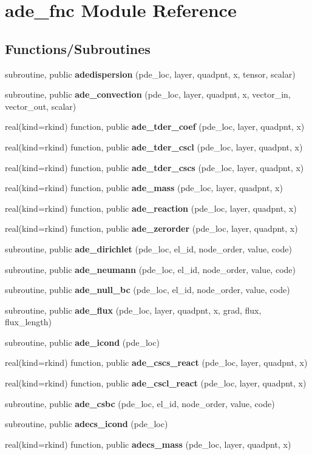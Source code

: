 \section{ade\+\_\+fnc Module Reference}
\label{namespaceade__fnc}
\subsection*{Functions/\+Subroutines}
\begin{DoxyCompactItemize}
\item 
subroutine, public {\bf adedispersion} (pde\+\_\+loc, layer, quadpnt, x, tensor, scalar)
\item 
subroutine, public {\bf ade\+\_\+convection} (pde\+\_\+loc, layer, quadpnt, x, vector\+\_\+in, vector\+\_\+out, scalar)
\item 
real(kind=rkind) function, public {\bf ade\+\_\+tder\+\_\+coef} (pde\+\_\+loc, layer, quadpnt, x)
\item 
real(kind=rkind) function, public {\bf ade\+\_\+tder\+\_\+cscl} (pde\+\_\+loc, layer, quadpnt, x)
\item 
real(kind=rkind) function, public {\bf ade\+\_\+tder\+\_\+cscs} (pde\+\_\+loc, layer, quadpnt, x)
\item 
real(kind=rkind) function, public {\bf ade\+\_\+mass} (pde\+\_\+loc, layer, quadpnt, x)
\item 
real(kind=rkind) function, public {\bf ade\+\_\+reaction} (pde\+\_\+loc, layer, quadpnt, x)
\item 
real(kind=rkind) function, public {\bf ade\+\_\+zerorder} (pde\+\_\+loc, layer, quadpnt, x)
\item 
subroutine, public {\bf ade\+\_\+dirichlet} (pde\+\_\+loc, el\+\_\+id, node\+\_\+order, value, code)
\item 
subroutine, public {\bf ade\+\_\+neumann} (pde\+\_\+loc, el\+\_\+id, node\+\_\+order, value, code)
\item 
subroutine, public {\bf ade\+\_\+null\+\_\+bc} (pde\+\_\+loc, el\+\_\+id, node\+\_\+order, value, code)
\item 
subroutine, public {\bf ade\+\_\+flux} (pde\+\_\+loc, layer, quadpnt, x, grad, flux, flux\+\_\+length)
\item 
subroutine, public {\bf ade\+\_\+icond} (pde\+\_\+loc)
\item 
real(kind=rkind) function, public {\bf ade\+\_\+cscs\+\_\+react} (pde\+\_\+loc, layer, quadpnt, x)
\item 
real(kind=rkind) function, public {\bf ade\+\_\+cscl\+\_\+react} (pde\+\_\+loc, layer, quadpnt, x)
\item 
subroutine, public {\bf ade\+\_\+csbc} (pde\+\_\+loc, el\+\_\+id, node\+\_\+order, value, code)
\item 
subroutine, public {\bf adecs\+\_\+icond} (pde\+\_\+loc)
\item 
real(kind=rkind) function, public {\bf adecs\+\_\+mass} (pde\+\_\+loc, layer, quadpnt, x)
\end{DoxyCompactItemize}


